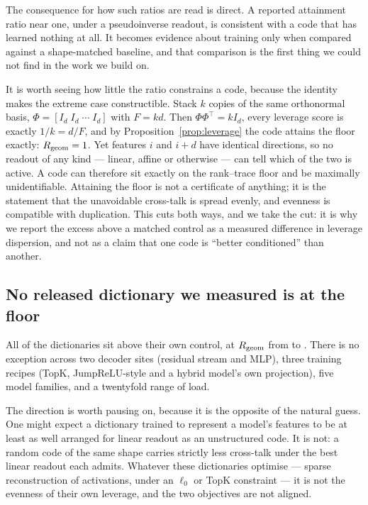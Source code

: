The consequence for how such ratios are read is direct. A reported attainment ratio near one, under a
pseudoinverse readout, is consistent with a code that has learned nothing at all. It becomes evidence
about training only when compared against a shape-matched baseline, and that comparison is the first
thing we could not find in the work we build on.

It is worth seeing how little the ratio constrains a code, because the identity makes the extreme
case constructible. Stack $k$ copies of the same orthonormal basis, $\Phi=[I_d\;I_d\;\cdots\;I_d]$
with $F=kd$. Then $\Phi\Phi^{\top}=k I_d$, every leverage score is exactly $1/k=d/F$, and by
Proposition~\ref{prop:leverage} the code attains the floor exactly: $R_{\mathrm{geom}}=1$. Yet features $i$ and
$i+d$ have identical directions, so no readout of any kind --- linear, affine or otherwise --- can
tell which of the two is active. A code can therefore sit exactly on the rank--trace floor and be
maximally unidentifiable. Attaining the floor is not a certificate of anything; it is the statement
that the unavoidable cross-talk is spread evenly, and evenness is compatible with duplication. This
cuts both ways, and we take the cut: it is why we report the excess above a matched control as a
measured difference in leverage dispersion, and not as a claim that one code is ``better conditioned''
than another.

\subsection{No released dictionary we measured is at the floor}

All \SaeDictsAboveControl{} of the \SaeDicts{} dictionaries sit above their own control, at $R_{\mathrm{geom}}$
from \SaeDictRgeomMin{} to \SaeDictRgeomMax{}. There is no exception across two decoder sites
(residual stream and MLP), three training recipes (TopK, JumpReLU-style and a hybrid model's own
projection), five model families, and a twentyfold range of load.

The direction is worth pausing on, because it is the opposite of the natural guess. One might expect
a dictionary trained to represent a model's features to be at least as well arranged for linear
readout as an unstructured code. It is not: a random code of the same shape carries strictly less
cross-talk under the best linear readout each admits. Whatever these dictionaries optimise --- sparse
reconstruction of activations, under an $\ell_0$ or TopK constraint --- it is not the evenness of
their own leverage, and the two objectives are not aligned.

